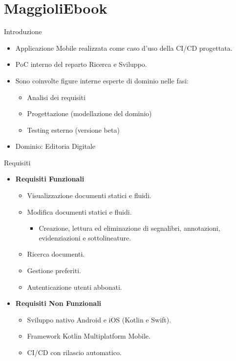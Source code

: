 
\section{MaggioliEbook}
    \begin{frame}{Introduzione}
        \begin{itemize}
            \item Applicazione Mobile realizzata come caso d'uso della CI/CD progettata.
            \item PoC interno del reparto Ricerca e Sviluppo.
            \item Sono coinvolte figure interne esperte di dominio nelle fasi:
            \begin{itemize}
                \item Analisi dei requisiti
                \item Progettazione (modellazione del dominio)
                \item Testing esterno (versione beta)
            \end{itemize}
            \item Dominio: Editoria Digitale
        \end{itemize}
    \end{frame}

    \begin{frame}{Requisiti}
        \begin{itemize}
            \item \textbf{Requisiti Funzionali}
            \begin{itemize}
                \item Visualizzazione documenti statici e fluidi.
                \item Modifica documenti statici e fluidi.
                \begin{itemize}
                    \item Creazione, lettura ed eliminazione di segnalibri, annotazioni, evidenziazioni e sottolineature.
                \end{itemize}
                \item Ricerca documenti.
                \item Gestione preferiti.
                \item Autenticazione utenti abbonati.
            \end{itemize}
            \item \textbf{Requisiti Non Funzionali}
            \begin{itemize}
                \item Sviluppo nativo Android e iOS (Kotlin e Swift).
                \item Framework Kotlin Multiplatform Mobile.
                \item CI/CD con rilascio automatico.
            \end{itemize}
        \end{itemize}
    \end{frame}
    
